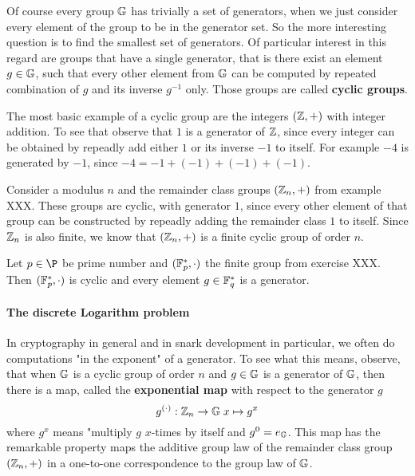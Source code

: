 Of course every group $\mathbb{G}$ has trivially a set of generators, when we just consider every element of the group to be in the generator set. So the more interesting question is to find the smallest set of generators. Of particular interest in this regard are groups that have a single generator, that is there exist an element $g\in\mathbb{G}$, such that every other element from $\mathbb{G}$ can be computed by repeated combination of $g$ and its inverse $g^{-1}$ only. Those groups are called \textbf{cyclic groups}.
\begin{example} The most basic example of a cyclic group are the integers $(\mathbb{Z},+)$ with integer addition. To see that observe that $1$ is a generator of $\mathbb{Z}$, since every integer can be obtained by repeadly add either $1$ or its inverse $-1$ to itself. For example 
$-4$ is generated by $-1$, since $-4=-1+(-1)+(-1)+(-1)$. 
\end{example}
\begin{example} Consider a modulus $n$ and the remainder class groups $(\mathbb{Z}_n,+)$ from example XXX. These groups are cyclic, with generator $1$, since every other element of that group can be constructed by repeadly adding the remainder class $1$ to itself. Since $\mathbb{Z}_n$ is also finite, we know that $(\mathbb{Z}_n,+)$ is a finite cyclic group of order $n$.
\end{example}
\begin{example} Let $p\in\P$ be prime number and $(\mathbb{F}_p^*,\cdot)$ the finite group from exercise XXX. Then $(\mathbb{F}_p^*,\cdot)$ is cyclic and every element $g\in\mathbb{F}_q^*$ is a generator. 
\end{example}
\paragraph{The discrete Logarithm problem}
In cryptography in general and in snark development in particular, we often do computations "in the exponent" of a generator. To see what this means, observe, that when 
$\mathbb{G}$ is a cyclic group of order $n$ and $g\in \mathbb{G}$ is a generator of $\mathbb{G}$, then there is a map, called the \textbf{exponential map} with respect to the generator $g$
\begin{equation}
g^{(\cdot)}: \mathbb{Z}_n \to \mathbb{G}\; x \mapsto g^x
\end{equation}
where $g^x$ means "multiply $g$ $x$-times by itself and $g^0=e_{\mathbb{G}}$. This map has the remarkable property maps the additive group law of the remainder class group $(\mathbb{Z}_n,+)$ in a one-to-one correspondence to the group law of $\mathbb{G}$. 

